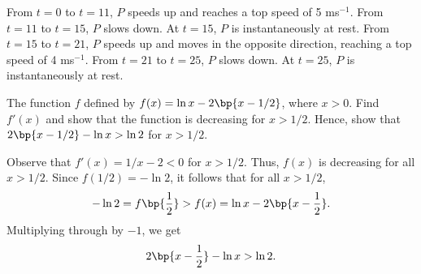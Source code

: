 \begin{solution}
    \begin{ppart}
        From $t = 0$ to $t = 11$, $P$ speeds up and reaches a top speed of 5 ms$^{-1}$. From $t=11$ to $t=15$, $P$ slows down. At $t=15$, $P$ is instantaneously at rest. From $t=15$ to $t=21$, $P$ speeds up and moves in the opposite direction, reaching a top speed of 4 ms$^{-1}$. From $t=21$ to $t=25$, $P$ slows down. At $t=25$, $P$ is instantaneously at rest.
    \end{ppart}
    \begin{ppart}
        \begin{center}
        \end{center}
    \end{ppart}
\end{solution}

\begin{problem}
    The function $f$ defined by $f(x) = \ln x - 2\bp{x-1/2}$, where $x > 0$. Find $f'(x)$ and show that the function is decreasing for $x > 1/2$. Hence, show that $2\bp{x - 1/2} - \ln x > \ln 2$ for $x > 1/2$.
\end{problem}
\begin{solution}
    Observe that $f'(x) = 1/x - 2 < 0$ for $x > 1/2$. Thus, $f(x)$ is decreasing for all $x > 1/2$. Since $f(1/2) = -\ln 2$, it follows that for all $x > 1/2$, \[-\ln 2 = f\bp{\frac12} > f(x) = \ln x - 2\bp{x - \frac12}.\] Multiplying through by $-1$, we get \[2\bp{x - \frac12} - \ln x > \ln 2.\]
\end{solution}